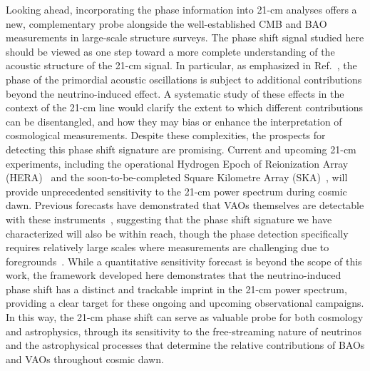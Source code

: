 Looking ahead, incorporating the phase information into 21-cm analyses offers a new, complementary probe alongside the well-established CMB and BAO measurements in large-scale structure surveys. The phase shift signal studied here should be viewed as one step toward a more complete understanding of the acoustic structure of the  21-cm signal. In particular, as emphasized in Ref.~\cite{Green:2020fjb}, the phase of the primordial acoustic oscillations is subject to additional contributions beyond the neutrino-induced effect. A systematic study of these effects in the context of the 21-cm line would clarify the extent to which different contributions can be disentangled, and how they may bias or enhance the interpretation of cosmological measurements. Despite these complexities, the prospects for detecting this phase shift signature are promising. Current and upcoming 21-cm experiments, including the operational Hydrogen Epoch of Reionization Array (HERA)~\citep{deboer17,hera23} and the soon-to-be-completed Square Kilometre Array (SKA)~\citep{SKA:2018ckk, SKA19}, will provide unprecedented sensitivity to the 21-cm power spectrum during cosmic dawn. Previous forecasts have demonstrated that VAOs themselves are detectable with these instruments~\cite{munoz19b, Sarkar:2022mdz}, suggesting that the phase shift signature we have characterized will also be within reach, though the phase detection specifically requires relatively large scales where measurements are challenging due to foregrounds~\cite{liu20}.
While a quantitative sensitivity forecast is beyond the scope of this work, the framework developed here demonstrates that the neutrino-induced phase shift has a distinct and trackable imprint in the 21-cm power spectrum, providing a clear target for these ongoing and upcoming observational campaigns. In this way, the 21-cm phase shift can serve as valuable probe for both cosmology and astrophysics, through its sensitivity to the free-streaming nature of neutrinos and the astrophysical processes that determine the relative contributions of BAOs and VAOs throughout cosmic dawn.



